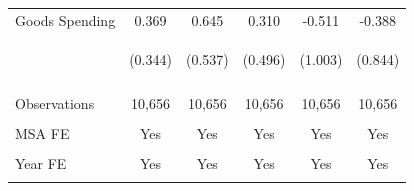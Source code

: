 \documentclass[dv_diss_main.tex]{subfiles}
\begin{document}
\begin{table}[H]
\begin{center}
\begin{tabular}{lccccc}
    Goods Spending & 0.369 & 0.645 & 0.310 & -0.511 & -0.388 \\
     & \begin{footnotesize}(0.344)\end{footnotesize} & \begin{footnotesize}(0.537)\end{footnotesize} & \begin{footnotesize}(0.496)\end{footnotesize} & \begin{footnotesize}(1.003)\end{footnotesize} & \begin{footnotesize}(0.844)\end{footnotesize} \\

    \vspace{4pt} & \begin{footnotesize}\end{footnotesize} & \begin{footnotesize}\end{footnotesize} & \begin{footnotesize}\end{footnotesize} & \begin{footnotesize}\end{footnotesize} & \begin{footnotesize}\end{footnotesize} \\
    Observations & 10,656 & 10,656 & 10,656 & 10,656 & 10,656 \\
    \vspace{-2pt} & \vspace{-2pt} & \vspace{-2pt} & \vspace{-2pt} & \vspace{-2pt} \\
    MSA FE & Yes & Yes & Yes & Yes & Yes \\
    \vspace{-2pt} & \vspace{-2pt} & \vspace{-2pt} & \vspace{-2pt} & \vspace{-2pt} \\
    Year FE & Yes & Yes & Yes & Yes & Yes \\
    \vspace{-2pt} & \vspace{-2pt} & \vspace{-2pt} & \vspace{-2pt} & \vspace{-2pt} \\

\end{tabular}
\end{center}
\end{table}
\end{document}
